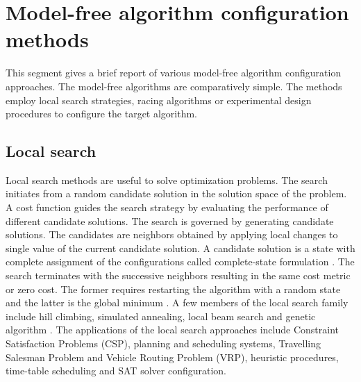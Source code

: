 

\section{Model-free algorithm configuration methods}
\label{section:model-free}

This segment gives a brief report of various model-free algorithm configuration approaches. The model-free algorithms are comparatively simple. The methods employ local search strategies, racing algorithms or experimental design procedures to configure the target algorithm.

\subsection{Local search}

Local search methods are useful to solve optimization problems. The search initiates from a random candidate solution in the solution space of the problem. A cost function guides the search strategy by evaluating the performance of different candidate solutions. The search is governed by generating candidate solutions. The candidates are neighbors obtained by applying local changes to single value of the current candidate solution. A candidate solution is a state with complete assignment of the configurations called complete-state formulation \cite{Russell_Norvig}. The search terminates with the successive neighbors resulting in the same cost metric or zero cost. The former requires restarting the algorithm with a random state and the latter is the global minimum \cite{Localsearch_constraintbook}. A few members of the local search family include hill climbing, simulated annealing, local beam search and genetic algorithm \cite{Russell_Norvig}. The applications of the local search approaches include Constraint Satisfaction Problems (CSP), planning and scheduling systems, Travelling Salesman Problem and Vehicle Routing Problem (VRP), heuristic procedures, time-table scheduling and SAT solver configuration.

